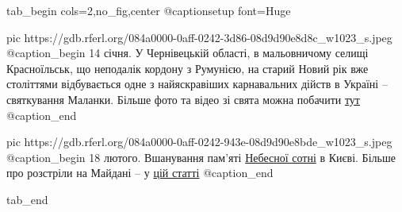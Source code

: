  
 
 
 
 


\ifcmt
  tab_begin cols=2,no_fig,center
     @captionsetup font=Huge

     pic https://gdb.rferl.org/084a0000-0aff-0242-3d86-08d9d90e8d8c_w1023_s.jpeg
     @caption_begin
14 січня. У Чернівецькій області, в мальовничому селищі Красноїльськ, що
неподалік кордону з Румунією, на старий Новий рік вже століттями
відбувається одне з найяскравіших карнавальних дійств в Україні –
святкування Маланки. Більше фото та відео зі свята можна побачити 
\href{https://www.radiosvoboda.org/a/31048285.html}{тут} 
     @caption_end

     pic https://gdb.rferl.org/084a0000-0aff-0242-943e-08d9d90e8bde_w1023_s.jpeg
     @caption_begin
18 лютого. Вшанування пам'яті
\href{https://www.radiosvoboda.org/a/photo-nebesna-sotnya-vshanuvannya-kyiv/31109687.html}{Небесної
сотні} в Києві. Більше про розстріли на Майдані – у \href{https://www.radiosvoboda.org/a/dbr-i-henprokuror-pro-zavershennya-rozsliduvannya-rozstriliv-na-maydani/31564810.html}{цій статті}
     @caption_end

  tab_end
\fi

